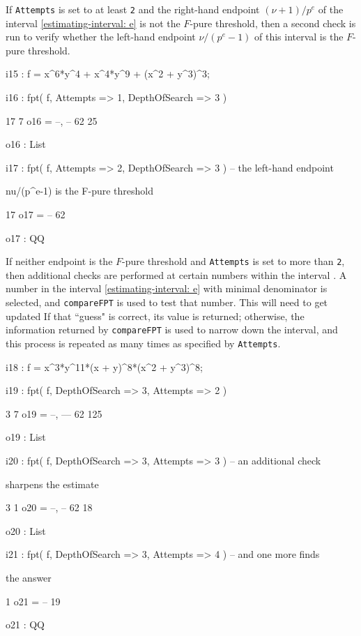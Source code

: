 \documentclass{amsart}
\begin{document}
If  {\tt Attempts} is set to at least {\tt 2} and the right-hand endpoint $(\nu+1)/p^e$ of the interval \eqref{estimating-interval: e} is not the $F$-pure threshold, then a second check is run to verify whether the left-hand endpoint $\nu/(p^e-1)$ of this interval is the $F$-pure threshold.

{\small
{}
\begin{MyVerbatim}

i15 : f = x^6*y^4 + x^4*y^9 + (x^2 + y^3)^3;

i16 : fpt( f, Attempts => 1, DepthOfSearch => 3 )

       17   7
o16 = {--, --}
       62  25

o16 : List

i17 : fpt( f, Attempts => 2, DepthOfSearch => 3 ) -- the left-hand endpoint

      nu/(p^e-1) is the F-pure threshold

      17
o17 = --
      62

o17 : QQ

\end{MyVerbatim}
}

            If neither endpoint is the $F$-pure threshold and {\tt Attempts} is set to more than {\tt 2}, then  additional checks are performed at certain numbers within the interval .  A number in the interval \eqref{estimating-interval: e} with minimal denominator is selected, and {\tt compareFPT} is used to test that number. {\color{red} This will need to get updated} If that ``guess" is correct, its value is returned; otherwise, the information returned by {\tt compareFPT} is used to narrow down the interval, and this process is repeated as many times as specified by {\tt Attempts}.

{\small
{}
\begin{MyVerbatim}

i18 : f = x^3*y^11*(x + y)^8*(x^2 + y^3)^8;

i19 : fpt( f, DepthOfSearch => 3, Attempts => 2 )

        3   7
o19 = {--, ---}
       62  125

o19 : List

i20 : fpt( f, DepthOfSearch => 3, Attempts => 3 ) -- an additional check

      sharpens the estimate

        3   1
o20 = {--, --}
       62  18

o20 : List

i21 : fpt( f, DepthOfSearch => 3, Attempts => 4 ) -- and one more finds

      the answer

       1
o21 = --
      19

o21 : QQ

\end{MyVerbatim}
}
\end{document}
